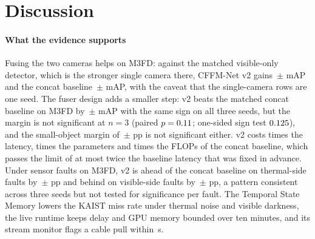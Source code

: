 \section{Discussion}
\label{sec:discussion}
\paragraph{What the evidence supports}
Fusing the two cameras helps on M3FD: against the matched visible-only detector, which is the stronger single camera there, CFFM-Net v2 gains \gainMfdCffmVtwoOverBestMeanMap{}\,$\pm$\,\gainMfdCffmVtwoOverBestStdMap{}\,mAP and the concat baseline \gainMfdConcatMdOverBestMeanMap{}\,$\pm$\,\gainMfdConcatMdOverBestStdMap{}\,mAP, with the caveat that the single-camera rows are one seed. The fuser design adds a smaller step: v2 beats the matched concat baseline on M3FD by \marMfdVtwoVsConcatMdMeanMap{}\,$\pm$\,\marMfdVtwoVsConcatMdStdMap{}\,mAP with the same sign on all three seeds, but the margin is not significant at $n=3$ (paired $p=0.11{}$; one-sided sign test $0.125{}$), and the small-object margin of \marMfdVtwoVsConcatMdMeanApSmall{}\,$\pm$\,\marMfdVtwoVsConcatMdStdApSmall{}\,pp is not significant either. v2 costs \latLocalRatioMedian{} times the latency, \latLocalRatioParams{} times the parameters and \latLocalRatioGflops{} times the FLOPs of the concat baseline, which passes the limit of at most twice the baseline latency that was fixed in advance. Under sensor faults on M3FD, v2 is ahead of the concat baseline on thermal-side faults by \fltMfdMarginMeanThermalAvgSevThreeMap{}\,$\pm$\,\fltMfdMarginStdThermalAvgSevThreeMap{}\,pp and behind on visible-side faults by \fltMfdMarginMeanVisibleAvgSevThreeMap{}\,$\pm$\,\fltMfdMarginStdVisibleAvgSevThreeMap{}\,pp, a pattern consistent across three seeds but not tested for significance per fault. The Temporal State Memory lowers the KAIST miss rate under thermal noise and visible darkness, the live runtime keeps delay and GPU memory bounded over ten minutes, and its stream monitor flags a cable pull within \livFaultOnUnpluggedDetectS{}\,s.

